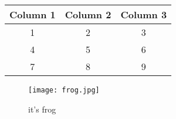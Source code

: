 \documentclass{article}
\begin{document}
\begin{center}
\begin{tabular}{|| c c c ||}
\hline
Column 1 & Column 2 & Column 3\\
\hline\hline
1 & 2 & 3 \\
\hline
4 & 5 & 6 \\
\hline
7 & 8 & 9 \\
\hline
\end{tabular}
\end{center}

\begin{figure}
\centering
\texttt{[image: frog.jpg]}
\caption{it's frog}
\end{figure}
\end{document}
